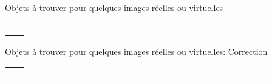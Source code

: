 \documentclass{article}
\newcommand{\titre}[1]{\hfil{\Large #1}}
\begin{document}
\titre{Objets \`a trouver pour quelques images r\'eelles ou virtuelles}
\begin{tabular}{|c|c|}
\hline
&\\ \hline
&\\ \hline
&\\ \hline
&\\ \hline
\end{tabular}


\newpage


\titre{Objets \`a trouver pour quelques images r\'eelles ou virtuelles: Correction}
\begin{tabular}{|c|c|}
\hline
&\\ \hline
&\\ \hline
&\\ \hline
&\\ \hline
\end{tabular}


\newpage
\end{document}
